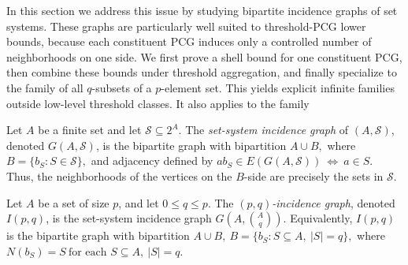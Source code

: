 \documentclass[a4paper,UKenglish,cleveref,autoref,thm-restate]{socg-lipics-v2021}
\begin{document}
In this section we address this issue by studying bipartite incidence graphs of set
systems. These graphs are particularly well suited to threshold-\textsc{PCG} lower
bounds, because each constituent \textsc{PCG} induces only a controlled number of
neighborhoods on one side. We first prove a shell bound for one constituent
\textsc{PCG}, then combine these bounds under threshold aggregation, and finally
specialize to the family of all $q$-subsets of a $p$-element set. This yields explicit
infinite families outside low-level threshold classes. 
It also applies to the family

\begin{definition}
Let $A$ be a finite set and let $\mathcal S\subseteq 2^A$. The \emph{set-system incidence
graph} of $(A,\mathcal S)$, denoted $G(A,\mathcal S)$, is the bipartite graph with
bipartition
\(
A\cup B,
\)
where
\(
B=\{b_S:S\in\mathcal S\},
\)
and adjacency defined by
\(
ab_S\in E(G(A,\mathcal S))
\ \Longleftrightarrow\ 
a\in S.
\)
Thus, the neighborhoods of the vertices on the $B$-side are precisely the sets in
$\mathcal S$.
\end{definition}

\begin{definition}
Let $A$ be a set of size $p$, and let $0\le q\le p$. The \emph{$(p,q)$-incidence graph},
denoted $I(p,q)$, is the set-system incidence graph
\(
G\!\left(A,\binom{A}{q}\right).
\)
Equivalently, $I(p,q)$ is the bipartite graph with bipartition
\(
A\cup B,
\ 
B=\{b_S:S\subseteq A,\ |S|=q\},
\)
where
\(
N(b_S)=S
\ \text{for each }S\subseteq A,\ |S|=q.
\)
\end{definition}
\end{document}
